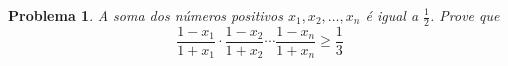 \documentclass{hipatia}
\newtheorem{problem*}{Problema}
\begin{document}
\begin{problem*}

A soma dos números positivos $x_1, x_2, \ldots, x_n$ é igual a $\frac{1}{2}$. Prove que $$\frac{1-x_1}{1+x_1} \cdot \frac{1-x_2}{1+x_2} \cdots \frac{1-x_n}{1+x_n} \geq \frac{1}{3}$$
	
\end{problem*}

\nocite{*}
\vfill
\end{document}

